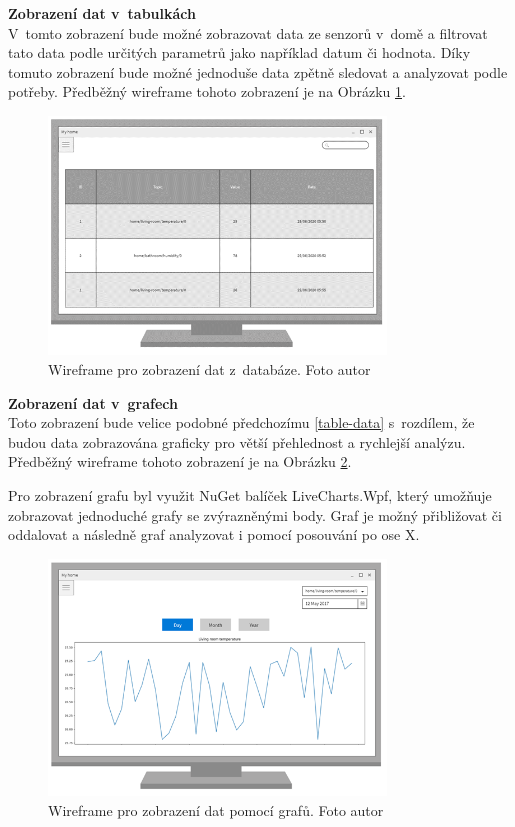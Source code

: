 \noindent\textbf{Zobrazení dat v~tabulkách}\mbox{} \\ \label{table-data}
V~tomto zobrazení bude možné zobrazovat data ze senzorů v~domě a filtrovat tato data podle určitých parametrů jako například datum či hodnota. Díky tomuto zobrazení bude možné jednoduše data zpětně sledovat a analyzovat podle potřeby. Předběžný wireframe tohoto zobrazení je na Obrázku \ref{secondScreenWireframe}.

\begin{figure}[H]
  \centering
  \includegraphics[width=0.8\textwidth]{obrazky-figures/applicationWireframe/secondScreen.png}
  \caption{Wireframe pro zobrazení dat z~databáze. Foto autor}
  \label{secondScreenWireframe}
\end{figure}

\noindent\textbf{Zobrazení dat v~grafech}\mbox{} \\
Toto zobrazení bude velice podobné předchozímu \ref{table-data} s~rozdílem, že budou data zobrazována graficky pro větší přehlednost a rychlejší analýzu. Předběžný wireframe tohoto zobrazení je na Obrázku \ref{thirdScreenWireframe}.

Pro zobrazení grafu byl využit NuGet balíček LiveCharts.Wpf, který umožňuje zobrazovat jednoduché grafy se zvýrazněnými body. Graf je možný přibližovat či oddalovat a následně graf analyzovat i pomocí posouvání po ose X.

\begin{figure}[H]
  \centering
  \includegraphics[width=0.8\textwidth]{obrazky-figures/applicationWireframe/thirdScreen.png}
  \caption{Wireframe pro zobrazení dat pomocí grafů. Foto autor}
  \label{thirdScreenWireframe}
\end{figure}

